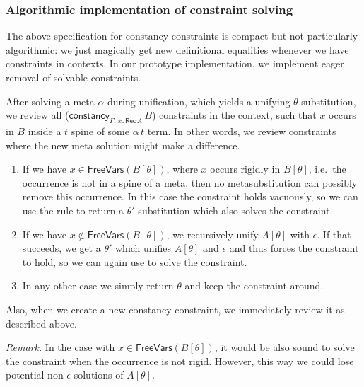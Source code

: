 \documentclass[acmsmall,review,anonymous,prologue,dvipsnames]{acmart}\settopmatter{printfolios=true,printccs=false,printacmref=false}
\newcommand{\constancy}{\mathsf{constancy}}
\newcommand{\FreeVars}{\mathsf{FreeVars}}
\newcommand{\Rec}{\mathsf{Rec}}
\newcommand{\ol}[1]{\overline{#1}}
\theoremstyle{remark}
\begin{document}
\subsubsection{Algorithmic implementation of constraint solving}
\label{sec:algorithmic}
The above specification for constancy constraints is compact but not
particularly algorithmic: we just magically get new definitional equalities
whenever we have constraints in contexts. In our prototype implementation, we
implement eager removal of solvable constraints.

After solving a meta $\alpha$ during unification, which yields a unifying
$\theta$ substitution, we review all ($\constancy_{\Gamma,\,x : \Rec\,A}\,B$)
constraints in the context, such that $x$ occurs in $B$ inside a $\ol{t}$ spine
of some $\alpha\,\ol{t}$ term. In other words, we review constraints where the
new meta solution might make a difference.
\begin{enumerate}
  \item If we have $x \in \FreeVars(B[\theta])$, where $x$ occurs rigidly in
    $B[\theta]$, i.e.\ the occurrence is not in a spine of a meta, then no
    metasubstitution can possibly remove this occurrence. In this case the
    constraint holds vacuously, so we can use the 
    rule to return a $\theta'$ substitution which also solves the constraint.
  \item If we have $x \notin \FreeVars(B[\theta])$, we recursively unify
    $A[\theta]$ with $\epsilon$. If that succeeds, we get a $\theta'$ which
    unifies $A[\theta]$ and $\epsilon$ and thus forces the constraint to hold, so we
    can again use  to solve the constraint.
  \item
    In any other case we simply return $\theta$ and keep the constraint around.
\end{enumerate}
Also, when we create a new constancy constraint, we immediately review it
as described above.

\emph{Remark.} In the case with $x \in \FreeVars(B[\theta])$, it would be also
sound to solve the constraint when the occurrence is not rigid. However, this
way we could lose potential non-$\epsilon$ solutions of $A[\theta]$.
\end{document}
